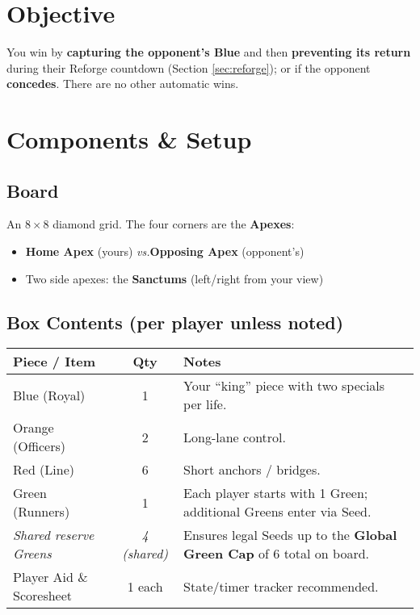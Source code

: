 \documentclass[11pt]{article}
\begin{document}
\section{Objective}
\label{sec:objective}

You win by \textbf{capturing the opponent’s Blue} and then \textbf{preventing its return} during their Reforge countdown (Section \ref{sec:reforge}); or if the opponent \textbf{concedes}. There are no other automatic wins.

\section{Components \& Setup}
\label{sec:setup}

\subsection*{Board}
An \(8\times 8\) diamond grid. The four corners are the \textbf{Apexes}:
\begin{itemize}[leftmargin=1.3em,itemsep=0.2em]
  \item \textbf{Home Apex} (yours) \quad\textit{vs.}\quad \textbf{Opposing Apex} (opponent’s)
  \item Two side apexes: the \textbf{Sanctums} (left/right from your view)
\end{itemize}

\subsection*{Box Contents (per player unless noted)}
\begin{tabularx}{\linewidth}{@{}l c X@{}}
\toprule
\textbf{Piece / Item} & \textbf{Qty} & \textbf{Notes} \\
\midrule
Blue (Royal) & 1 & Your “king” piece with two specials per life. \\
Orange (Officers) & 2 & Long-lane control. \\
Red (Line) & 6 & Short anchors / bridges. \\
Green (Runners) & 1 & Each player starts with 1 Green; additional Greens enter via Seed. \\
\textit{Shared reserve Greens} & \textit{4 (shared)} & Ensures legal Seeds up to the \textbf{Global Green Cap} of 6 total on board. \\
\midrule
Player Aid \& Scoresheet & 1 each & State/timer tracker recommended. \\
\bottomrule
\end{tabularx}
\end{document}
